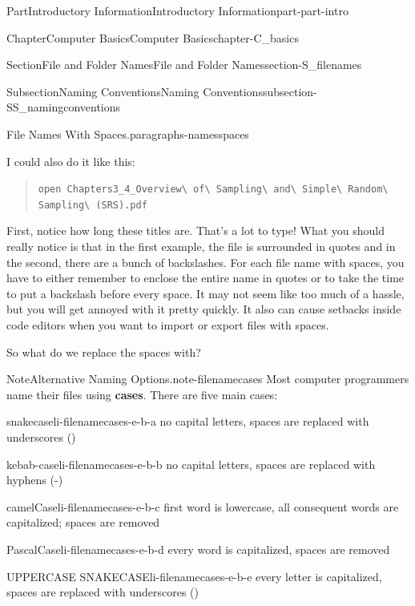 \documentclass[oneside,10pt,]{book}
\newcommand{\mono}[1]{\texttt{#1}}
\newcommand{\terminology}[1]{\textbf{#1}}
\begin{document}
\begin{partptx}{Part}{Introductory Information}{}{Introductory Information}{}{}{part-part-intro}
\begin{chapterptx}{Chapter}{Computer Basics}{}{Computer Basics}{}{}{chapter-C_basics}
\begin{sectionptx}{Section}{File and Folder Names}{}{File and Folder Names}{}{}{section-S_filenames}
\begin{subsectionptx}{Subsection}{Naming Conventions}{}{Naming Conventions}{}{}{subsection-SS_namingconventions}
\begin{paragraphs}{File Names With Spaces.}{paragraphs-namesspaces}
\begin{quote}
\end{quote}
I could also do it like this:%
\begin{quote}%
\mono{open Chapters3\_4\_Overview\textbackslash{} of\textbackslash{} Sampling\textbackslash{} and\textbackslash{} Simple\textbackslash{} Random\textbackslash{} Sampling\textbackslash{} (SRS).pdf}%
\end{quote}
First, notice how long these titles are. That's a lot to type! What you should really notice is that in the first example, the file is surrounded in quotes and in the second, there are a bunch of backslashes. For each file name with spaces, you have to either remember to enclose the entire name in quotes or to take the time to put a backslash before every space. It may not seem like too much of a hassle, but you will get annoyed with it pretty quickly. It also can cause setbacks inside code editors when you want to import or export files with spaces.%
\par
So what do we replace the spaces with?%
\begin{note}{Note}{Alternative Naming Options.}{note-filenamecases}%
%
%
%
Most computer programmers name their files using \terminology{cases}. There are five main cases:%
\begin{descriptionlist}
\begin{dlimedium}{snake\textunderscore{}case}{li-filenamecases-e-b-a}%
no capital letters, spaces are replaced with underscores (\textunderscore{})%
\end{dlimedium}%
\begin{dlimedium}{kebab-case}{li-filenamecases-e-b-b}%
no capital letters, spaces are replaced with hyphens (-)%
\end{dlimedium}%
\begin{dlimedium}{camelCase}{li-filenamecases-e-b-c}%
first word is lowercase, all consequent words are capitalized; spaces are removed%
\end{dlimedium}%
\begin{dlimedium}{PascalCase}{li-filenamecases-e-b-d}%
every word is capitalized, spaces are removed%
\end{dlimedium}%
\begin{dlimedium}{UPPER\textunderscore{}CASE\textunderscore{} SNAKE\textunderscore{}CASE}{li-filenamecases-e-b-e}%
every letter is capitalized, spaces are replaced with underscores (\textunderscore{})%
\end{dlimedium}%
\end{descriptionlist}

\end{note}
\end{paragraphs}
\end{subsectionptx}
\end{sectionptx}
\end{chapterptx}
\end{partptx}
\end{document}
